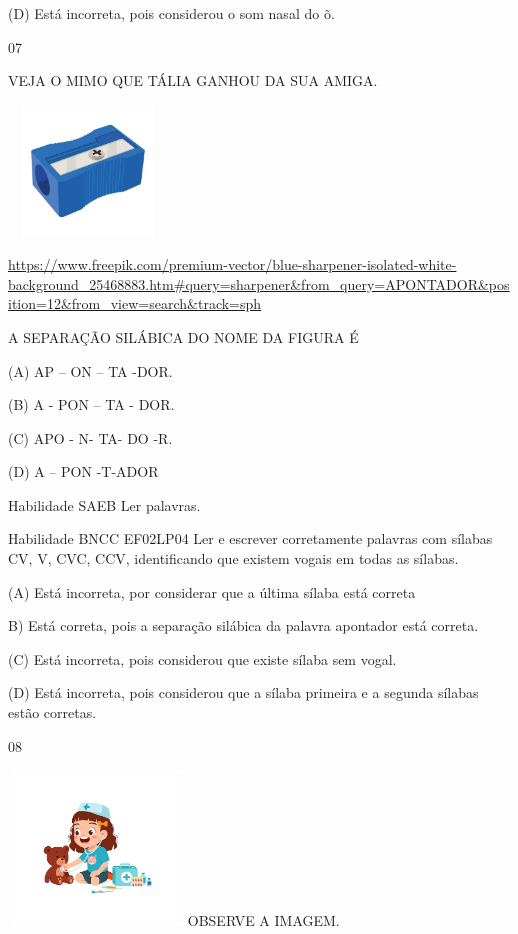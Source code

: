 {{{{{{(D) Está incorreta, pois considerou o som nasal do õ.

\num{07}

VEJA O MIMO QUE TÁLIA GANHOU DA SUA AMIGA.

\includegraphics[width=1.67273in,height=1.37251in]{media/image168.jpeg}

\url{https://www.freepik.com/premium-vector/blue-sharpener-isolated-white-background_25468883.htm\#query=sharpener\&from_query=APONTADOR\&position=12\&from_view=search\&track=sph}

A SEPARAÇÃO SILÁBICA DO NOME DA FIGURA É

(A) AP -- ON -- TA -DOR.

(B) A - PON -- TA - DOR.

(C) APO - N- TA- DO -R.

(D) A -- PON -T-ADOR

Habilidade SAEB Ler palavras.

Habilidade BNCC EF02LP04 Ler e escrever corretamente palavras com
sílabas CV, V, CVC, CCV, identificando que existem vogais em todas as
sílabas.

(A) \protect\hypertarget{_Hlk129375975}{}{}Está incorreta, por
considerar que a última sílaba está correta

B) Está correta, pois a separação silábica da palavra apontador está
correta.

(C) Está incorreta, pois considerou que existe sílaba sem vogal.

(D) Está incorreta, pois considerou que a sílaba primeira e a segunda
sílabas estão corretas.

\num{08}

\includegraphics[width=1.87273in,height=1.62645in]{media/image169.jpeg}OBSERVE
A IMAGEM.

}}}}}}
